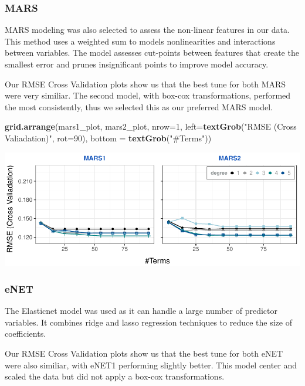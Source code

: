 \documentclass[]{report}
\newenvironment{Shaded}{\begin{snugshade}}{\end{snugshade}}
\newcommand{\DataTypeTok}[1]{\textcolor[rgb]{0.13,0.29,0.53}{#1}}
\newcommand{\DecValTok}[1]{\textcolor[rgb]{0.00,0.00,0.81}{#1}}
\newcommand{\KeywordTok}[1]{\textcolor[rgb]{0.13,0.29,0.53}{\textbf{#1}}}
\newcommand{\NormalTok}[1]{#1}
\newcommand{\StringTok}[1]{\textcolor[rgb]{0.31,0.60,0.02}{#1}}
\begin{document}
\hypertarget{mars}{%
\subsubsection{MARS}\label{mars}}

MARS modeling was also selected to assess the non-linear features in our
data. This method uses a weighted sum to models nonlinearities and
interactions between variables. The model assesses cut-points between
features that create the smallest error and prunes insignificant points
to improve model accuracy.

Our RMSE Cross Validation plots show us that the best tune for both MARS
were very similiar. The second model, with box-cox transformations,
performed the most consistently, thus we selected this as our preferred
MARS model.

\begin{Shaded}
\begin{Highlighting}[]
\KeywordTok{grid.arrange}\NormalTok{(mars1_plot, mars2_plot, }\DataTypeTok{nrow=}\DecValTok{1}\NormalTok{, }\DataTypeTok{left=}\KeywordTok{textGrob}\NormalTok{(}\StringTok{"RMSE (Cross Valiadation)"}\NormalTok{, }\DataTypeTok{rot=}\DecValTok{90}\NormalTok{), }\DataTypeTok{bottom =} \KeywordTok{textGrob}\NormalTok{(}\StringTok{"#Terms"}\NormalTok{))}
\end{Highlighting}
\end{Shaded}

\includegraphics{Proj2-JM_files/figure-latex/unnamed-chunk-7-1.pdf}

\hypertarget{enet}{%
\subsubsection{eNET}\label{enet}}

The Elasticnet model was used as it can handle a large number of
predictor variables. It combines ridge and lasso regression techniques
to reduce the size of coefficients.

Our RMSE Cross Validation plots show us that the best tune for both eNET
were also similiar, with eNET1 performing slightly better. This model
center and scaled the data but did not apply a box-cox transformations.
\end{document}
